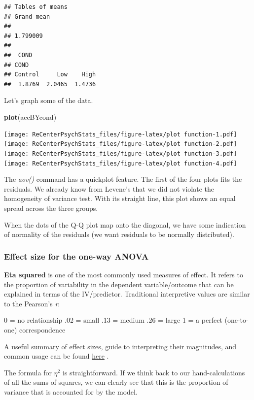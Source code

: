 \documentclass[
  english,
]{book}
\newenvironment{Shaded}{\begin{snugshade}}{\end{snugshade}}
\newcommand{\KeywordTok}[1]{\textcolor[rgb]{0.13,0.29,0.53}{\textbf{#1}}}
\newcommand{\NormalTok}[1]{#1}
\begin{document}
\begin{verbatim}
## Tables of means
## Grand mean
##          
## 1.799009 
## 
##  COND 
## COND
## Control     Low    High 
##  1.8769  2.0465  1.4736
\end{verbatim}

Let's graph some of the data.

\begin{Shaded}
\begin{Highlighting}[]
\KeywordTok{plot}\NormalTok{(accBYcond) }
\end{Highlighting}
\end{Shaded}

\texttt{[image: ReCenterPsychStats\_files/figure-latex/plot function-1.pdf]} \texttt{[image: ReCenterPsychStats\_files/figure-latex/plot function-2.pdf]} \texttt{[image: ReCenterPsychStats\_files/figure-latex/plot function-3.pdf]} \texttt{[image: ReCenterPsychStats\_files/figure-latex/plot function-4.pdf]}

The \emph{aov()} command has a quickplot feature. The first of the four plots fits the residuals. We already know from Levene's that we did not violate the homogeneity of variance test. With its straight line, this plot shows an equal spread across the three groups.

When the dots of the Q-Q plot map onto the diagonal, we have some indication of normality of the residuals (we want residuals to be normally distributed).

\hypertarget{effect-size-for-the-one-way-anova}{%
\subsubsection{Effect size for the one-way ANOVA}\label{effect-size-for-the-one-way-anova}}

\textbf{Eta squared} is one of the most commonly used measures of effect. It refers to the proportion of variability in the dependent variable/outcome that can be explained in terms of the IV/predictor. Traditional interpretive values are similar to the Pearson's \emph{r}:

0 = no relationship
.02 = small
.13 = medium
.26 = large
1 = a perfect (one-to-one) correspondence

A useful summary of effect sizes, guide to interpreting their magnitudes, and common usage can be found \href{https://imaging.mrc-cbu.cam.ac.uk/statswiki/FAQ/effectSize}{here} \citep{watson_rules_2020}.

The formula for \(\eta^2\) is straightforward. If we think back to our hand-calculations of all the sums of squares, we can clearly see that this is the proportion of variance that is accounted for by the model.
\end{document}
